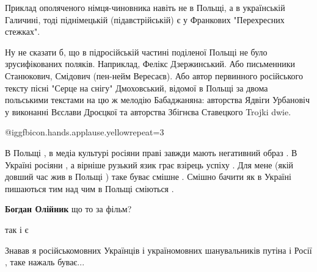 \begin{itemize}
\begin{itemize}
\end{itemize} %


Приклад ополяченого німця-чиновника навіть не в Польщі, а в українській
Галичині, тоді піднімецькій (підавстрійській) є у Франкових "Перехресних
стежках".



Ну не сказати б, що в підросійській частині поділеної Польщі не було
зрусифікованих поляків. Наприклад, Фелікс Дзержинський. Або письменники
Станюкович, Смідович (пен-нейм Вересаєв). Або автор первинного російського
тексту пісні "Серце на снігу" Дмоховський, відомої в Польщі за двома польськими
текстами на цю ж мелодію Бабаджаняна: авторства Ядвіги Урбановіч у виконанні
Вєслави Дроєцкої та авторства Збігнєва Ставецкого Trojki dwie.

 @igg{fbicon.hands.applause.yellow}{repeat=3} 


В Польщі , в медіа культурі росіяни праві завжди мають негативний образ . В
Україні росіяни , а вірніше рузький язик грає взірець успіху . Для мене (якій
довший час жив в Польщі ) таке буває смішне . Смішно бачити як в Україні
пишаються тим над чим в Польщі сміються .

\begin{itemize} %
\textbf{Богдан Олійник} що то за фільм?
\end{itemize} %

так і є

Знавав я російськомовних Українців і україномовних шанувальників путіна і Росії , таке нажаль буває...
\end{itemize} %
